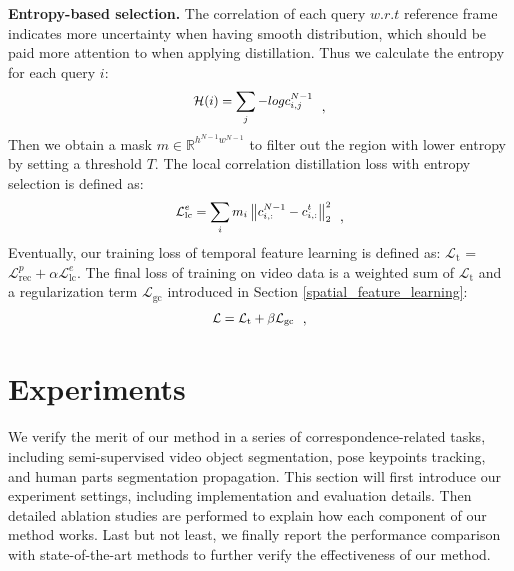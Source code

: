 \documentclass{article}
\begin{document}
\textbf{Entropy-based selection.} The correlation of each query $w.r.t$ reference frame indicates more uncertainty when having smooth distribution, which should be paid more attention to when applying distillation. Thus we calculate the entropy for each query $i$:
\begin{equation}\label{eq:pyramid reconstruction loss}
  \small
  \begin{aligned}
    \mathcal{H}(i)=\sum_j-log c^{N-1}_{i,j}
  \end{aligned}~~,
\end{equation}
Then we obtain a mask $m \in \mathbb{R}^{h^{N-1}w^{N-1}}$ to filter out the region with lower entropy by setting a threshold $T$. The local correlation distillation loss with entropy selection is defined as:
\begin{equation}\label{eq:reconstruction loss}
  \small
  \begin{aligned}
    \mathcal{L}^e_{\mathrm{lc}}=\sum_im_i\left\|c_{i,:}^{N-1}-c_{i,:}^t\right\|^2_{2}
  \end{aligned}~~,
\end{equation}
Eventually, our training loss of temporal feature learning is defined as: $\mathcal{L}_\mathrm{t}$ =  $\mathcal{L}^p_{\mathrm{rec}} + \alpha  \mathcal{L}^e_{\mathrm{lc}}$. The final loss of training on video data is a weighted sum of  $\mathcal{L}_\mathrm{t}$ and a regularization term $\mathcal{L}_\mathrm{gc}$ introduced in Section \ref{spatial_feature_learning}:
\begin{equation}\label{eq:final loss}
  \small
  \begin{aligned}
    \mathcal{L} = \mathcal{L}_{\mathrm{t}}  + \beta  \mathcal{L}_{\mathrm{gc}}
  \end{aligned}~~,
\end{equation}


\section{Experiments}
We verify the merit of our method in a series of correspondence-related tasks, including semi-supervised video object segmentation, pose keypoints tracking, and human parts segmentation propagation. This section will first introduce our experiment settings, including implementation and evaluation details. Then detailed ablation studies are performed to explain how each component of our method works. Last but not least, we finally report the performance comparison with state-of-the-art methods to further verify the effectiveness of our method.
\end{document}
